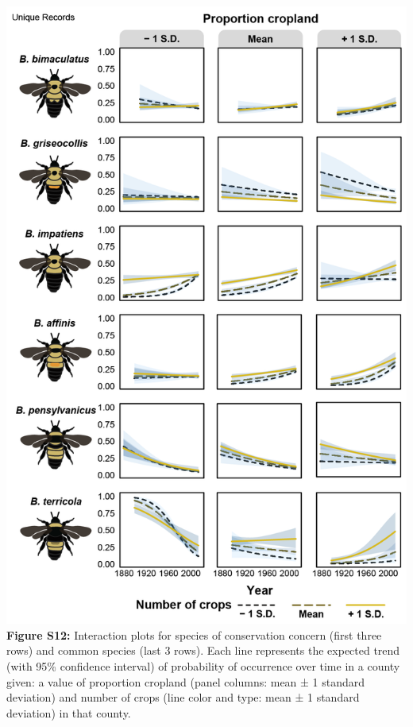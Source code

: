 \documentclass[11pt,]{article}
\begin{document}
\includegraphics[width=1\textwidth,height=\textheight]{../ms_figs/fig_s12.png}
\textbf{Figure S12:} Interaction plots for species of conservation
concern (first three rows) and common species (last 3 rows). Each line
represents the expected trend (with 95\% confidence interval) of
probability of occurrence over time in a county given: a value of
proportion cropland (panel columns: mean ± 1 standard deviation) and
number of crops (line color and type: mean ± 1 standard deviation) in
that county. \clearpage

\newpage
\end{document}
